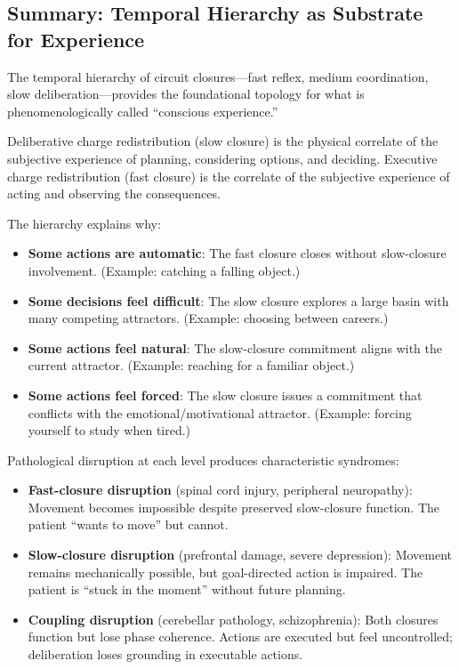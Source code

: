 \subsection{Summary: Temporal Hierarchy as Substrate for Experience}

The temporal hierarchy of circuit closures—fast reflex, medium coordination, slow deliberation—provides the foundational topology for what is phenomenologically called ``conscious experience.''

Deliberative charge redistribution (slow closure) is the physical correlate of the subjective experience of planning, considering options, and deciding. Executive charge redistribution (fast closure) is the correlate of the subjective experience of acting and observing the consequences.

The hierarchy explains why:
\begin{itemize}
\item \textbf{Some actions are automatic}: The fast closure closes without slow-closure involvement. (Example: catching a falling object.)
\item \textbf{Some decisions feel difficult}: The slow closure explores a large basin with many competing attractors. (Example: choosing between careers.)
\item \textbf{Some actions feel natural}: The slow-closure commitment aligns with the current attractor. (Example: reaching for a familiar object.)
\item \textbf{Some actions feel forced}: The slow closure issues a commitment that conflicts with the emotional/motivational attractor. (Example: forcing yourself to study when tired.)
\end{itemize}

Pathological disruption at each level produces characteristic syndromes:
\begin{itemize}
\item \textbf{Fast-closure disruption} (spinal cord injury, peripheral neuropathy): Movement becomes impossible despite preserved slow-closure function. The patient ``wants to move'' but cannot.
\item \textbf{Slow-closure disruption} (prefrontal damage, severe depression): Movement remains mechanically possible, but goal-directed action is impaired. The patient is ``stuck in the moment'' without future planning.
\item \textbf{Coupling disruption} (cerebellar pathology, schizophrenia): Both closures function but lose phase coherence. Actions are executed but feel uncontrolled; deliberation loses grounding in executable actions.
\end{itemize}